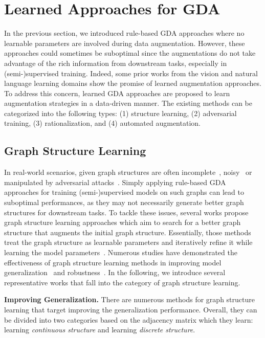 \documentclass[11pt]{article}
\renewcommand\paragraph[1]{\vspace{0.05in} \noindent \textbf{#1.}}
\begin{document}
\section{Learned Approaches for GDA}
\label{sec:tong_learnedaug}

In the previous section, we introduced rule-based GDA approaches where no learnable parameters are involved during data augmentation. However, these approaches could sometimes be suboptimal since the augmentations do not take advantage of the rich information from downstream tasks, especially in (semi-)supervised training. Indeed, some prior works from the vision \cite{cubuk2019autoaugment} and natural language \cite{niu2019automatically} learning domains show the promise of learned augmentation approaches. To address this concern, learned GDA approaches are proposed to learn augmentation strategies in a data-driven manner. The existing methods can be categorized into the following types: (1) structure learning, (2) adversarial training, (3) rationalization, and (4) automated augmentation.


\subsection{Graph Structure Learning}
\label{sec:tong_gsl}
In real-world scenarios, given graph structures are often incomplete~\cite{franceschi2019learning}, noisy~\cite{jin2020graph,luo2021learning} or manipulated by adversarial attacks~\cite{jin2020adversarial,gunnemann2022graph}. Simply applying rule-based GDA approaches for training (semi-)supervised models on such graphs can lead to suboptimal performances, as they may not necessarily generate better graph structures for downstream tasks. To tackle these issues, several works propose graph structure learning approaches which aim to search for a better graph structure that augments the initial graph structure.
Essentially, those methods treat the graph structure as learnable parameters and iteratively refine it while learning the model parameters~\cite{zhao2021data,jin2020graph,franceschi2019learning,chen2020iterative,luo2021learning,zheng2020robust}. Numerous studies have demonstrated the effectiveness of graph structure learning methods in improving model generalization~\cite{zhao2021data,chen2020iterative} and robustness~\cite{jin2020graph,zheng2020robust}. In the following, we introduce several representative works that fall into the category of graph structure learning. 

\paragraph{Improving Generalization} There are numerous methods for graph structure learning that target improving the generalization performance. Overall, they can be divided into two categories based on the adjacency matrix which they learn: learning \emph{continuous structure} and learning \emph{discrete structure}.
\end{document}

